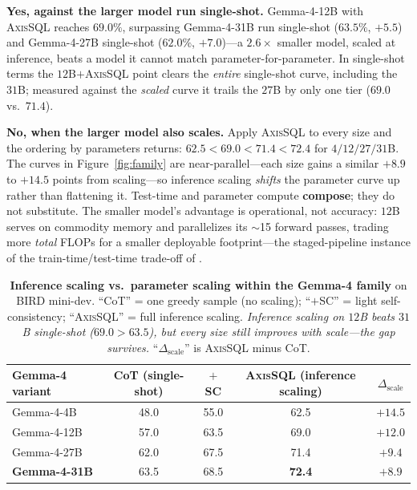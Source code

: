 \documentclass{article}
\newcommand{\sys}{\textsc{AxisSQL}\xspace}
\newcommand{\bestcell}[1]{\textbf{#1}}
\begin{document}
\textbf{Yes, against the larger model run single-shot.} Gemma-4-12B with \sys{} reaches $69.0\%$, surpassing Gemma-4-31B run single-shot ($63.5\%$, $+5.5$) and Gemma-4-27B single-shot ($62.0\%$, $+7.0$)---a $2.6\times$ smaller model, scaled at inference, beats a model it cannot match parameter-for-parameter. In single-shot terms the $12$B$+$\sys{} point clears the \emph{entire} single-shot curve, including the $31$B; measured against the \emph{scaled} curve it trails the $27$B by only one tier ($69.0$ vs.\ $71.4$).

\textbf{No, when the larger model also scales.} Apply \sys{} to every size and the ordering by parameters returns: $62.5 < 69.0 < 71.4 < 72.4$ for $4/12/27/31$B. The curves in Figure~\ref{fig:family} are near-parallel---each size gains a similar $+8.9$ to $+14.5$ points from scaling---so inference scaling \emph{shifts} the parameter curve up rather than flattening it. Test-time and parameter compute \textbf{compose}; they do not substitute. The smaller model's advantage is operational, not accuracy: $12$B serves on commodity memory and parallelizes its $\sim$15 forward passes, trading more \emph{total} FLOPs for a smaller deployable footprint---the staged-pipeline instance of the train-time/test-time trade-off of \citet{snell2025scaling}.

\begin{table}[t]
\centering
\small
\caption{\textbf{Inference scaling vs.\ parameter scaling within the Gemma-4 family} on BIRD mini-dev. ``CoT'' = one greedy sample (no scaling); ``$+$SC'' = light self-consistency; ``\sys'' = full inference scaling. \emph{Inference scaling on $12$B beats $31$B single-shot ($69.0>63.5$), but every size still improves with scale---the gap survives.} ``$\Delta_{\text{scale}}$'' is \sys{} minus CoT.}
\label{tab:family}
\begin{tabular}{@{}lcccc@{}}
\toprule
\textbf{Gemma-4 variant} & \textbf{CoT (single-shot)} & \textbf{$+$SC} & \textbf{\sys{} (inference scaling)} & \textbf{$\Delta_{\text{scale}}$} \\
\midrule
Gemma-4-4B   & 48.0 & 55.0 & 62.5 & $+14.5$ \\
Gemma-4-12B  & 57.0 & 63.5 & 69.0 & $+12.0$ \\
Gemma-4-27B  & 62.0 & 67.5 & 71.4 & $+9.4$ \\
\textbf{Gemma-4-31B}  & 63.5 & 68.5 & \bestcell{72.4} & $+8.9$ \\
\bottomrule
\end{tabular}
\end{table}
\end{document}
